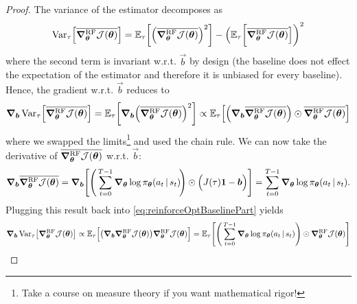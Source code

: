 			\begin{proof}
				The variance of the estimator decomposes as
				\begin{equation}
					\operatorname{Var}_\tau\Bigl[  \overline{\grad_{\bm{\theta}}^\mathrm{RF} \mathcal{J}(\bm{\theta})} \Bigr]
					= \mathbb{E}_\tau\biggl[ \Bigl( \overline{\grad_{\bm{\theta}}^\mathrm{RF} \mathcal{J}(\bm{\theta})} \Bigr)^2 \biggr] - \Bigl( \mathbb{E}_\tau\biggl[ \overline{\grad_{\bm{\theta}}^\mathrm{RF} \mathcal{J}(\bm{\theta})} \Bigr] \biggr)^2
				\end{equation}
				where the second term is invariant w.r.t. \(\vec{b}\) by design (the baseline does not effect the expectation of the estimator and therefore it is unbiased for every baseline). Hence, the gradient w.r.t. \(\vec{b}\) reduces to
				\begin{equation}
					\grad_{\bm{b}} \operatorname{Var}_\tau\Bigl[ \overline{\grad_{\bm{\theta}}^\mathrm{RF} \mathcal{J}(\bm{\theta})} \Bigr]
					= \mathbb{E}_\tau\biggl[ \grad_{\bm{b}} \Bigl( \overline{\grad_{\bm{\theta}}^\mathrm{RF} \mathcal{J}(\bm{\theta})} \Bigr)^2 \biggr]
					\propto \mathbb{E}_\tau\Bigl[ \Bigl( \grad_{\bm{b}} \overline{\grad_{\bm{\theta}}^\mathrm{RF} \mathcal{J}(\bm{\theta})} \Bigr) \odot \overline{\grad_{\bm{\theta}}^\mathrm{RF} \mathcal{J}(\bm{\theta})} \Bigr]
					\label{eq:reinforceOptBaselinePart}
				\end{equation}
				where we swapped the limits\footnote{Take a course on measure theory if you want mathematical rigor!} and used the chain rule. We can now take the derivative of \( \overline{\grad_{\bm{\theta}}^\mathrm{RF} \mathcal{J}(\bm{\theta})} \) w.r.t. \(\vec{b}\):
				\begin{equation}
					\grad_{\bm{b}} \overline{\grad_{\bm{\theta}}^\mathrm{RF} \mathcal{J}(\bm{\theta})}
					= \grad_{\bm{b}} \Biggl[ \Biggl(\, \sum_{t = 0}^{T - 1} \grad_{\bm{\theta}} \log \pi_{\bm{\theta}}(a_t \,\vert\, s_t) \!\Biggr) \odot \Bigl( J(\tau) \bm{1} - \bm{b} \Bigr) \Biggr]
					= \sum_{t = 0}^{T - 1} \grad_{\bm{\theta}} \log \pi_{\bm{\theta}}(a_t \,\vert\, s_t).
				\end{equation}
				Plugging this result back into \eqref{eq:reinforceOptBaselinePart} yields
				\begin{align}
					\grad_{\vec{b}} \Var_\tau\bigl[ \grad_{\vec{\theta}}^\mathrm{RF} \mathcal{J}(\vec{\theta}) \bigr]
					 & \propto \E_\tau\Bigl[ \bigl( \grad_{\vec{b}} \grad_{\vec{\theta}}^\mathrm{RF} \mathcal{J}(\vec{\theta}) \bigr) \grad_{\vec{\theta}}^\mathrm{RF} \mathcal{J}(\vec{\theta}) \Bigr]
					= \E_\tau\Biggl[ \Biggl(\, \sum_{t = 0}^{T - 1} \grad_{\vec{\theta}} \log \pi_{\vec{\theta}}(a_t \given s_t) \Biggr) \odot \grad_{\vec{\theta}}^\mathrm{RF} \mathcal{J}(\vec{\theta}) \Biggr]                                                                                                    \\

\end{align}
\end{proof}
